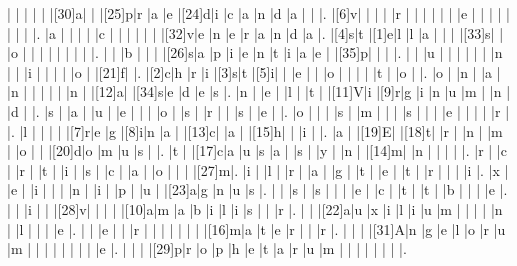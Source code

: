 \documentclass[12pt]{article}
\begin{document}
\begin{Puzzle}{22}{24}
  |{}  |{}  |{}  |{}  |{}  |[30]a|{}  |{}  |[25]p|r   |a   |e   |[24]d|i   |c   |a   |n   |d   |a   |{}  |{}  |.
  |[6]v|{}  |{}  |{}  |{}  |r   |{}  |{}  |{}  |{}  |{}  |{}  |e   |{}  |{}  |{}  |{}  |{}  |{}  |{}  |{}  |.
  |a   |{}  |{}  |{}  |{}  |c   |{}  |{}  |{}  |{}  |{}  |{}  |[32]v|e   |n   |e   |r   |a   |n   |d   |a   |.
  |[4]s|t   |[1]e|l   |l   |a   |{}  |{}  |{}  |[33]s|{}  |{}  |o   |{}  |{}  |{}  |{}  |{}  |{}  |{}  |{}  |.
  |{}  |{}  |b   |{}  |{}  |{}  |[26]s|a   |p   |i   |e   |n   |t   |i   |a   |e   |{}  |[35]p|{}  |{}  |{}  |.
  |{}  |{}  |u   |{}  |{}  |{}  |{}  |{}  |{}  |n   |{}  |{}  |i   |{}  |{}  |{}  |{}  |o   |{}  |[21]f|{}  |.
  |[2]c|h   |r   |i   |[3]s|t   |[5]i|{}  |{}  |e   |{}  |{}  |o   |{}  |{}  |{}  |{}  |t   |{}  |o   |{}  |.
  |o   |{}  |n   |{}  |a   |{}  |n   |{}  |{}  |{}  |{}  |{}  |n   |{}  |[12]a|{}  |[34]s|e   |d   |e   |s   |.
  |n   |{}  |e   |{}  |l   |{}  |t   |{}  |[11]V|i   |[9]r|g   |i   |n   |u   |m   |{}  |n   |{}  |d   |{}  |.
  |s   |{}  |a   |{}  |u   |{}  |e   |{}  |{}  |{}  |o   |{}  |s   |{}  |r   |{}  |{}  |s   |{}  |e   |{}  |.
  |o   |{}  |{}  |{}  |s   |{}  |m   |{}  |{}  |{}  |s   |{}  |{}  |{}  |e   |{}  |{}  |{}  |{}  |r   |{}  |.
  |l   |{}  |{}  |{}  |{}  |[7]r|e   |g   |[8]i|n   |a   |{}  |[13]c|{}  |a   |{}  |[15]h|{}  |{}  |i   |{}  |.
  |a   |{}  |[19]E|{}  |[18]t|{}  |r   |{}  |n   |{}  |m   |{}  |o   |{}  |{}  |[20]d|o   |m   |u   |s   |{}  |.
  |t   |{}  |[17]c|a   |u   |s   |a   |{}  |s   |{}  |y   |{}  |n   |{}  |[14]m|{}  |n   |{}  |{}  |{}  |{}  |.
  |r   |{}  |c   |{}  |r   |{}  |t   |{}  |i   |{}  |s   |{}  |c   |{}  |a   |{}  |o   |{}  |{}  |{}  |[27]m|.
  |i   |{}  |l   |{}  |r   |{}  |a   |{}  |g   |{}  |t   |{}  |e   |{}  |t   |{}  |r   |{}  |{}  |{}  |i   |.
  |x   |{}  |e   |{}  |i   |{}  |{}  |{}  |n   |{}  |i   |{}  |p   |{}  |u   |{}  |[23]a|g   |n   |u   |s   |.
  |{}  |{}  |s   |{}  |s   |{}  |{}  |{}  |e   |{}  |c   |{}  |t   |{}  |t   |{}  |b   |{}  |{}  |{}  |e   |.
  |{}  |{}  |i   |{}  |{}  |[28]v|{}  |{}  |{}  |{}  |[10]a|m   |a   |b   |i   |l   |i   |s   |{}  |{}  |r   |.
  |{}  |{}  |[22]a|u   |x   |i   |l   |i   |u   |m   |{}  |{}  |{}  |{}  |n   |{}  |l   |{}  |{}  |{}  |e   |.
  |{}  |{}  |e   |{}  |{}  |r   |{}  |{}  |{}  |{}  |{}  |{}  |{}  |[16]m|a   |t   |e   |r   |{}  |{}  |r   |.
  |{}  |{}  |{}  |[31]A|n   |g   |e   |l   |o   |r   |u   |m   |{}  |{}  |{}  |{}  |{}  |{}  |{}  |{}  |e   |.
  |{}  |{}  |{}  |[29]p|r   |o   |p   |h   |e   |t   |a   |r   |u   |m   |{}  |{}  |{}  |{}  |{}  |{}  |{}  |.
\end{Puzzle}
\end{document}
